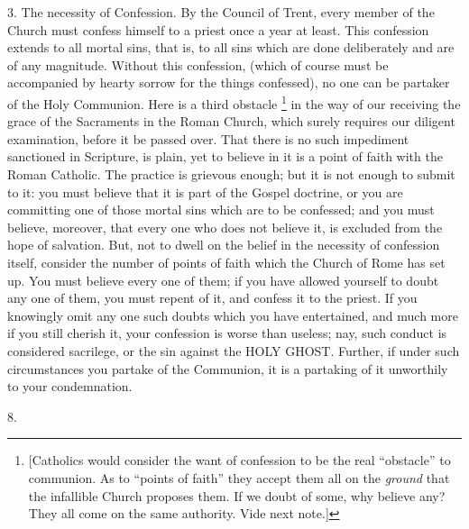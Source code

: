 3. The necessity of Confession. By the Council of
Trent, every member of the Church must confess himself to a priest once a year at least. This confession extends to all mortal
sins, that is, to all sins which are done deliberately and are of any
magnitude. Without this confession, (which of course must be
accompanied by hearty sorrow for the things confessed), no one can be
partaker of the Holy Communion. Here is a third obstacle \footnote{[Catholics would consider the want of confession to be the real ``obstacle''
to communion. As to ``points of faith'' they accept them all on the \emph{ground}
that the infallible Church proposes them. If we doubt of some, why
believe any? They all come on the same authority. Vide next note.]} in the way of our receiving the grace of the Sacraments in the
Roman Church, which surely requires our diligent examination, before
it be passed over. That there is no such impediment sanctioned in
Scripture, is plain, yet to believe in it is a point of faith with the
Roman Catholic. The practice is grievous enough; but it is not enough
to submit to it: you must believe that it is part of the Gospel
doctrine, or you are committing one of those mortal sins which are to
be confessed; and you must believe, moreover, that every one who does
not believe it, is excluded from the hope of salvation. But, not to
dwell on the belief in the necessity of confession itself, consider
the number of points of faith which the Church of Rome has set up. You
must believe every one of them; if you have allowed yourself to doubt
any one of them, you must repent of it, and confess it to the priest.
If you knowingly omit any one such doubts which you have entertained,
and much more if you still cherish it, your confession is worse than
useless; nay, such conduct is considered sacrilege, or the sin against
the HOLY GHOST.
Further, if under such circumstances you partake of the Communion, it
is a partaking of it unworthily to your condemnation.

8.

